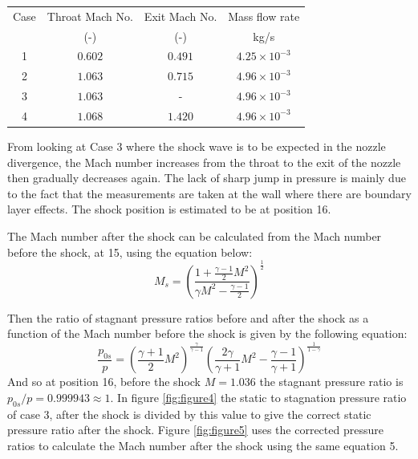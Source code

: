 \documentclass[8pt]{article}
\begin{document}
\begin{center}
    \begin{tabular}{|c|c|c|c|}
    \hline 
    Case & Throat Mach No.  & Exit Mach No. & Mass flow rate\\
     & (-) & (-) & kg/s \\
    \hline 
    1 & $0.602$ & $0.491$ & $ 4.25 \times 10^{-3} $ \\
    2 & $1.063$ & $0.715$ & $ 4.96 \times 10^{-3} $ \\
    3 & $1.063$ & - & $ 4.96 \times 10^{-3} $ \\
    4 & $1.068$ & $1.420$ & $ 4.96 \times 10^{-3} $ \\
    \hline
    \end{tabular}
    \label{tab:1}
\end{center}

From looking at Case 3 where the shock wave is to be expected in the nozzle divergence, the Mach number increases from the throat to the exit of the nozzle then gradually decreases again.
The lack of sharp jump in pressure is mainly due to the fact that the measurements are taken at the wall where there are boundary layer effects.
The shock position is estimated to be at position 16.


The Mach number after the shock can be calculated from the Mach number before the shock, at 15, using the equation below:
\begin{equation}
    M_s = \left( \frac{1 + \frac{\gamma - 1}{2} M^2}{\gamma M^2 - \frac{\gamma - 1}{2}} \right) ^ \frac{1}{2}
\end{equation}

Then the ratio of stagnant pressure ratios before and after the shock as a function of the Mach number before the shock is given by the following equation:
\begin{equation}
    \frac{p_{0s}}{p} = \left( \frac{\gamma + 1}{2} M^2 \right) ^ \frac{\gamma}{\gamma - 1} \left( \frac{2\gamma}{\gamma+1}M^2 - \frac{\gamma-1}{\gamma+1}\right) ^ \frac{1}{1 - \gamma}
\end{equation}
And so at position 16, before the shock $M = 1.036$ the stagnant pressure ratio is $p_{0s}/p = 0.999943 \approx 1$.
In figure \ref{fig:figure4} the static to stagnation pressure ratio of case 3, after the shock is divided by this value to give the correct static pressure ratio after the shock.
Figure \ref{fig:figure5} uses the corrected pressure ratios to calculate the Mach number after the shock using the same equation 5.
\end{document}
